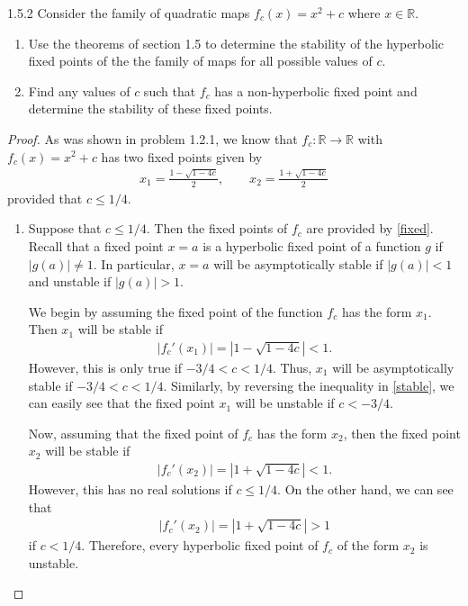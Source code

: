 \begin{problem}{1.5.2}
  Consider the family of quadratic maps $f_c(x) = x^2 + c$ where $x\in\mathbb{R}$.
  \begin{enumerate}
    \item Use the theorems of section 1.5 to determine the stability of the hyperbolic fixed points of the
      the family of maps for all possible values of $c$.
    \item Find any values of $c$ such that $f_c$ has a non-hyperbolic fixed point and
      determine the stability of these fixed points.
  \end{enumerate}
\end{problem}

\begin{proof}
  As was shown in problem 1.2.1, we know that $f_c:\mathbb{R}\to\mathbb{R}$ with $f_c(x) = x^2 + c$
  has two fixed points given by
  \begin{align}\label{fixed}
    x_1 = \frac{1 - \sqrt{1 - 4c}}{2}, \qquad         x_2 = \frac{1 + \sqrt{1 - 4c}}{2}
  \end{align}
  provided that $c \leq 1/4$.

  \begin{enumerate}
    \item Suppose that $c \leq 1/4$. Then the fixed points of
      $f_c$ are provided by \eqref{fixed}. Recall that a fixed point $x = a$ is a hyperbolic fixed point of
      a function $g$ if $|g(a)| \neq 1$. In particular, $x = a$ will be asymptotically stable if $|g(a)| < 1$
      and unstable if $|g(a)| > 1$.

      We begin by assuming the fixed point of the function $f_c$ has the form $x_1$. Then $x_1$ will be stable
      if
      \begin{align}\label{stable}
        |f_c'(x_1)| = |1 - \sqrt{1-4c}| < 1.
      \end{align}
      However, this is only true if $-3/4 < c < 1/4$. Thus, $x_1$ will be asymptotically stable if $-3/4 < c < 1/4$.
      Similarly, by reversing the inequality in \eqref{stable},
      we can easily see that the fixed point $x_1$ will be unstable if $c < -3/4$.

      Now, assuming that the fixed point of $f_c$ has the form $x_2$, then the fixed point $x_2$ will be stable if
      \begin{align*}
        |f_c'(x_2)| = |1 + \sqrt{1-4c}| < 1.
      \end{align*}
      However, this has no real solutions if $c \leq 1/4$. On the other hand, we can see that
      \begin{align*}
        |f_c'(x_2)| = |1 + \sqrt{1-4c}| > 1
      \end{align*}
      if $c < 1/4$. Therefore, every hyperbolic fixed point of $f_c$ of the form $x_2$ is unstable.


\end{enumerate}
\end{proof}
